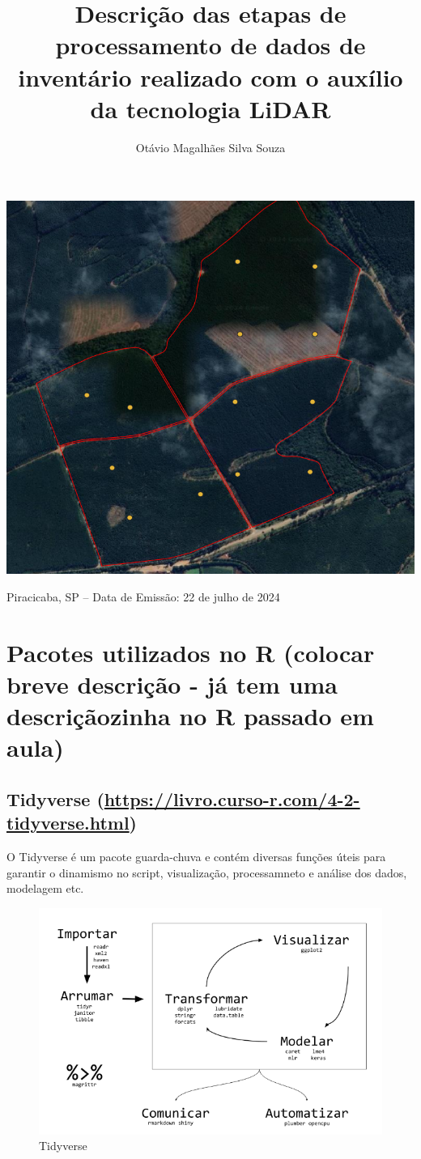 \documentclass[
]{article}
\title{Descrição das etapas de processamento de dados de inventário
realizado com o auxílio da tecnologia LiDAR}
\author{Otávio Magalhães Silva Souza}
\date{}
\begin{document}
\maketitle

\begin{center}\includegraphics[width=0.4\linewidth]{IMAGES/CAPA} \end{center}

\centerline {Piracicaba, SP – Data de Emissão: 22 de julho de 2024}
\newpage

\tableofcontents

\newpage

\section{Pacotes utilizados no R (colocar breve descrição - já tem uma
descriçãozinha no R passado em
aula)}\label{pacotes-utilizados-no-r-colocar-breve-descriuxe7uxe3o---juxe1-tem-uma-descriuxe7uxe3ozinha-no-r-passado-em-aula}

\subsection{\texorpdfstring{Tidyverse
(\url{https://livro.curso-r.com/4-2-tidyverse.html})}{Tidyverse (https://livro.curso-r.com/4-2-tidyverse.html)}}\label{tidyverse-httpslivro.curso-r.com4-2-tidyverse.html}

O Tidyverse é um pacote guarda-chuva e contém diversas funções úteis
para garantir o dinamismo no script, visualização, processamneto e
análise dos dados, modelagem etc.

\begin{figure}

{\centering \includegraphics[width=0.6\linewidth]{IMAGES/tidyverse} 

}

\caption{Tidyverse}\label{fig:unnamed-chunk-2}
\end{figure}
\end{document}
